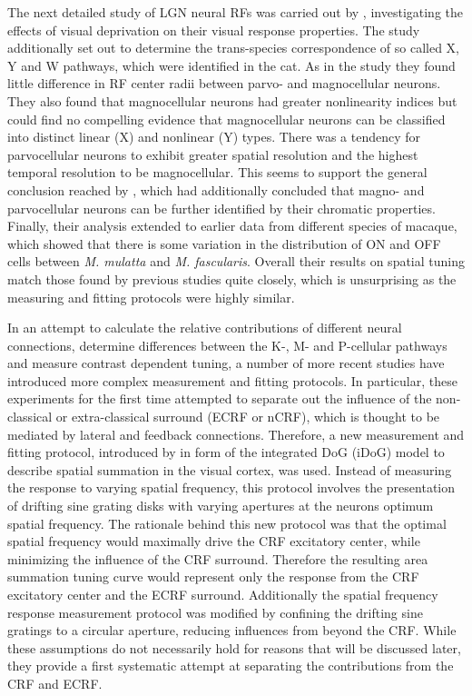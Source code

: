 The next detailed study of LGN neural RFs was carried out by
\cite{Levitt2001}, investigating the effects of visual deprivation on
their visual response properties. The study additionally set out to
determine the trans-species correspondence of so called X, Y and W
pathways, which were identified in the cat. As in the \cite{Spear1994}
study they found little difference in RF center radii between parvo-
and magnocellular neurons. They also found that magnocellular neurons
had greater nonlinearity indices but could find no compelling evidence
that magnocellular neurons can be classified into distinct linear (X)
and nonlinear (Y) types. There was a tendency for parvocellular
neurons to exhibit greater spatial resolution and the highest temporal
resolution to be magnocellular. This seems to support the general
conclusion reached by \cite{Derrington1984}, which had additionally
concluded that magno- and parvocellular neurons can be further
identified by their chromatic properties. Finally, their analysis
extended to earlier data from different species of macaque, which
showed that there is some variation in the distribution of ON and OFF
cells between \emph{M. mulatta} and \emph{M. fascularis}. Overall
their results on spatial tuning match those found by previous studies
quite closely, which is unsurprising as the measuring and fitting
protocols were highly similar.

In an attempt to calculate the relative contributions of different
neural connections, determine differences between the K-, M- and
P-cellular pathways and measure contrast dependent tuning, a number
of more recent studies have introduced more complex measurement and
fitting protocols. In particular, these experiments for the first time
attempted to separate out the influence of the non-classical or
extra-classical surround (ECRF or nCRF), which is thought to be
mediated by lateral and feedback connections. Therefore, a new
measurement and fitting protocol, introduced by \cite{Sceniak1999} in
form of the integrated DoG (iDoG) model to describe spatial summation
in the visual cortex, was used. Instead of measuring the response to
varying spatial frequency, this protocol involves the presentation of
drifting sine grating disks with varying apertures at the neurons
optimum spatial frequency. The rationale behind this new protocol was
that the optimal spatial frequency would maximally drive the CRF
excitatory center, while minimizing the influence of the CRF
surround. Therefore the resulting area summation tuning curve would
represent only the response from the CRF excitatory center and the
ECRF surround. Additionally the spatial frequency response measurement
protocol was modified by confining the drifting sine gratings to a
circular aperture, reducing influences from beyond the CRF. While
these assumptions do not necessarily hold for reasons that will be
discussed later, they provide a first systematic attempt at separating
the contributions from the CRF and ECRF.

